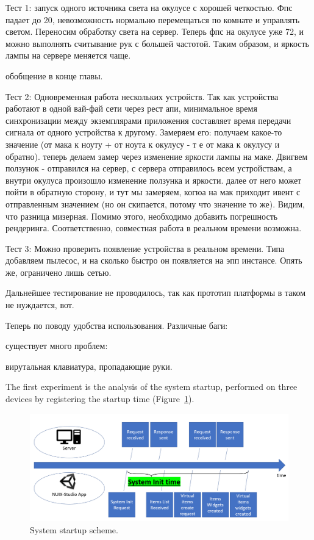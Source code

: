 Тест 1: запуск одного источника света на окулусе с хорошей четкостью. Фпс падает до 20, невозможность нормально перемещаться по комнате и управлять светом. Переносим обработку света на сервер. Теперь фпс на окулусе уже 72, и можно выполнять считывание рук с большей частотой. Таким образом, и яркость лампы на сервере меняется чаще. 

обобщение в конце главы.

Тест 2: Одновременная работа нескольких устройств. Так как устройства работают в одной вай-фай сети через рест апи, минимальное время синхронизации между экземплярами приложения составляет время передачи сигнала от одного устройства к другому. Замеряем его: получаем какое-то значение (от мака к ноуту + от ноута к окулусу - т е от мака к окулусу и обратно). теперь делаем замер через изменение яркости лампы на маке. Двигвем ползунок - отправился на сервер, с сервера отправилось всем устройствам, а внутри окулуса произошло изменение ползунка и яркости. далее от него может пойти в обратную сторону, и тут мы замеряем, когюа на мак приходит ивент с отправленным значением (но он скипается, потому что значение то же). Видим, что разница мизерная. Помимо этого, необходимо добавить погрешность рендеринга. Соответственно, совместная работа в реальном времени возможна.

Тест 3: Можно проверить появление устройства в реальном времени. Типа добавляем пылесос, и на сколько быстро он появляется на эпп инстансе. Опять же, ограничено лишь сетью.

Дальнейшее тестирование не проводилось, так как прототип платформы в таком не нуждается, вот.


Теперь по поводу удобства использования. Различные баги:

существует много проблем:

вирутальная клавиатура, пропадающие руки.




The first experiment is the analysis of the system startup, performed on three devices by registering the startup time (Figure~\ref{fig:SystemStartupScheme-figure}).

\begin{figure}
  \centering
  \includegraphics[width=0.9\linewidth]{figures/SystemStartupScheme.png}
  \caption{System startup scheme.}
  \label{fig:SystemStartupScheme-figure}
\end{figure}

